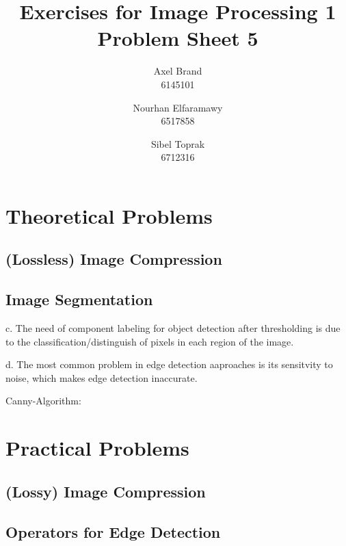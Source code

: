 \documentclass[a4paper,twocolumn]{article}
\title{\textbf{Exercises for Image Processing 1}\\Problem Sheet 5}
\author{Axel Brand\\6145101 \and Nourhan Elfaramawy\\6517858 \and Sibel Toprak\\6712316}
\begin{document}
	\maketitle
	
	\section{Theoretical Problems}
	
	

	
	\subsection{(Lossless) Image Compression}
	
	\subsection{Image Segmentation}
	
	c. The need of component labeling for object detection after thresholding is due to the classification/distinguish of pixels in each region of the image.
	
	d. The most common problem in edge detection aaproaches is its sensitvity to noise, which makes edge detection inaccurate.
	
	Canny-Algorithm:
	
	
	\section{Practical Problems}
	
	\subsection{(Lossy) Image Compression}
	
	\subsection{Operators for Edge Detection}
	
\end{document}
